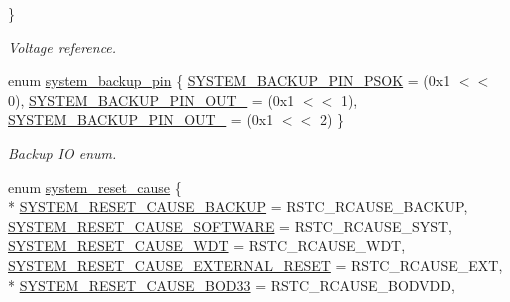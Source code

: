 \begin{DoxyCompactItemize}
 \}
\begin{DoxyCompactList}\small\item\em Voltage reference. \end{DoxyCompactList}\item 
enum \hyperlink{group__asfdoc__sam0__system__group_ga63d5519343f245cdbf57c247f1b50822}{system\+\_\+backup\+\_\+pin} \{ \hyperlink{group__asfdoc__sam0__system__group_gga63d5519343f245cdbf57c247f1b50822a37c45e27e161a1a5df2e345ba3a3167f}{S\+Y\+S\+T\+E\+M\+\_\+\+B\+A\+C\+K\+U\+P\+\_\+\+P\+I\+N\+\_\+\+P\+S\+O\+K} = (0x1 $<$$<$ 0), 
\hyperlink{group__asfdoc__sam0__system__group_gga63d5519343f245cdbf57c247f1b50822aa59523841e0d0349470befd4bc1c36a4}{S\+Y\+S\+T\+E\+M\+\_\+\+B\+A\+C\+K\+U\+P\+\_\+\+P\+I\+N\+\_\+\+O\+U\+T\+\_} = (0x1 $<$$<$ 1), 
\hyperlink{group__asfdoc__sam0__system__group_gga63d5519343f245cdbf57c247f1b50822aa07ecd1efac7cb215843db99ebff443f}{S\+Y\+S\+T\+E\+M\+\_\+\+B\+A\+C\+K\+U\+P\+\_\+\+P\+I\+N\+\_\+\+O\+U\+T\+\_} = (0x1 $<$$<$ 2)
 \}
\begin{DoxyCompactList}\small\item\em Backup I\+O enum. \end{DoxyCompactList}\item 
enum \hyperlink{group__asfdoc__sam0__system__group_gad1757cdfed2f30f012a3aec2e0f67ad3}{system\+\_\+reset\+\_\+cause} \{ \\*
\hyperlink{group__asfdoc__sam0__system__group_ggad1757cdfed2f30f012a3aec2e0f67ad3a43a00fe664fc187f036f5208d550942b}{S\+Y\+S\+T\+E\+M\+\_\+\+R\+E\+S\+E\+T\+\_\+\+C\+A\+U\+S\+E\+\_\+\+B\+A\+C\+K\+U\+P} = R\+S\+T\+C\+\_\+\+R\+C\+A\+U\+S\+E\+\_\+\+B\+A\+C\+K\+U\+P, 
\hyperlink{group__asfdoc__sam0__system__group_ggad1757cdfed2f30f012a3aec2e0f67ad3a8e5fb81626f25f1809ef477e51b433ce}{S\+Y\+S\+T\+E\+M\+\_\+\+R\+E\+S\+E\+T\+\_\+\+C\+A\+U\+S\+E\+\_\+\+S\+O\+F\+T\+W\+A\+R\+E} = R\+S\+T\+C\+\_\+\+R\+C\+A\+U\+S\+E\+\_\+\+S\+Y\+S\+T, 
\hyperlink{group__asfdoc__sam0__system__group_ggad1757cdfed2f30f012a3aec2e0f67ad3a79f22a7e3e5a4637623e953edefe3a10}{S\+Y\+S\+T\+E\+M\+\_\+\+R\+E\+S\+E\+T\+\_\+\+C\+A\+U\+S\+E\+\_\+\+W\+D\+T} = R\+S\+T\+C\+\_\+\+R\+C\+A\+U\+S\+E\+\_\+\+W\+D\+T, 
\hyperlink{group__asfdoc__sam0__system__group_ggad1757cdfed2f30f012a3aec2e0f67ad3ac053161d05ba5dc180fb4656e9f793f7}{S\+Y\+S\+T\+E\+M\+\_\+\+R\+E\+S\+E\+T\+\_\+\+C\+A\+U\+S\+E\+\_\+\+E\+X\+T\+E\+R\+N\+A\+L\+\_\+\+R\+E\+S\+E\+T} = R\+S\+T\+C\+\_\+\+R\+C\+A\+U\+S\+E\+\_\+\+E\+X\+T, 
\\*
\hyperlink{group__asfdoc__sam0__system__group_ggad1757cdfed2f30f012a3aec2e0f67ad3a5452f653acf6c46cd2dc4e04f4868814}{S\+Y\+S\+T\+E\+M\+\_\+\+R\+E\+S\+E\+T\+\_\+\+C\+A\+U\+S\+E\+\_\+\+B\+O\+D33} = R\+S\+T\+C\+\_\+\+R\+C\+A\+U\+S\+E\+\_\+\+B\+O\+D\+V\+D\+D, 
$$
\end{DoxyCompactItemize}
